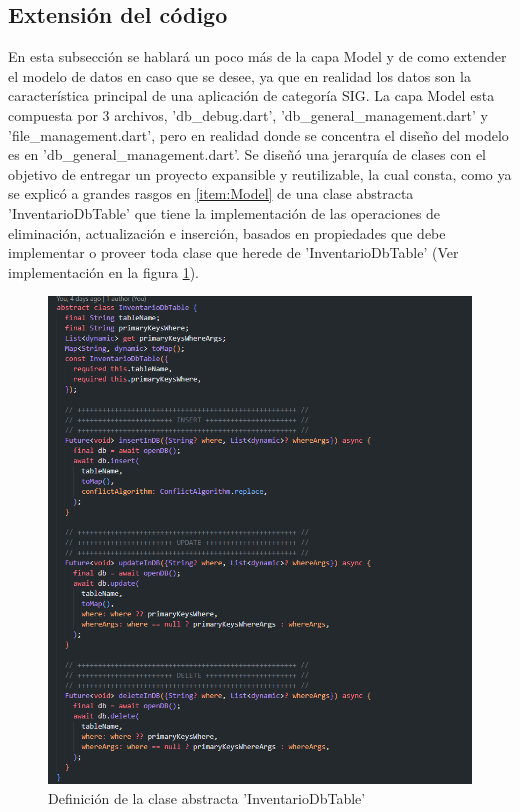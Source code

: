 \subsection{Extensión del código}
En esta subsección se hablará un poco más de la capa Model y de como extender el modelo de datos en caso que se desee, ya que en realidad los datos son la característica principal de una aplicación de categoría SIG.
La capa Model esta compuesta por 3 archivos, 'db\_debug.dart', 'db\_general\_management.dart' y 'file\_management.dart', pero en realidad donde se concentra el diseño del modelo es en 'db\_general\_management.dart'. Se diseñó una jerarquía de clases con el objetivo de
entregar un proyecto expansible y reutilizable, la cual consta, como ya se explicó a grandes rasgos en \ref{item:Model} de una clase abstracta 'InventarioDbTable' que tiene la implementación de las operaciones de eliminación, actualización e inserción, basados en propiedades que debe
implementar o proveer toda clase que herede de 'InventarioDbTable' (Ver implementación en la figura \ref{fig:figura18}).
\begin{figure}[h]
    \centering
    \includegraphics[scale=0.7]{Graphics/Capitulo 3/Definicion clase abstracta InventarioDBTable.png}
    \caption{Definición de la clase abstracta 'InventarioDbTable'}
    \label{fig:figura18}
\end{figure}

